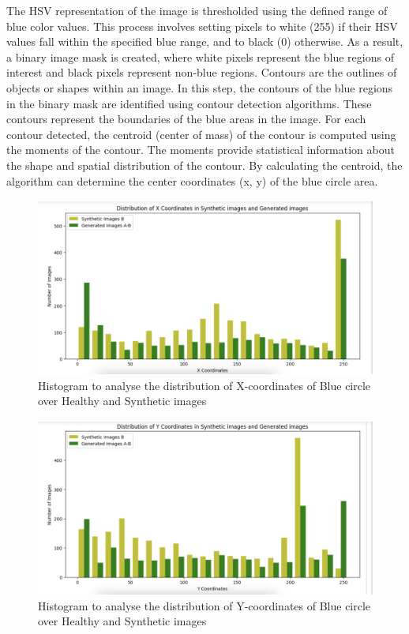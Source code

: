 \documentclass[UKenglish,12pt]{master-style}
\begin{document}
The HSV representation of the image is thresholded using the defined range of blue color values. This process involves setting pixels to white (255) if their HSV values fall within the specified blue range, and to black (0) otherwise. As a result, a binary image mask is created, where white pixels represent the blue regions of interest and black pixels represent non-blue regions. Contours are the outlines of objects or shapes within an image. In this step, the contours of the blue regions in the binary mask are identified using contour detection algorithms. These contours represent the boundaries of the blue areas in the image. For each contour detected, the centroid (center of mass) of the contour is computed using the moments of the contour. The moments provide statistical information about the shape and spatial distribution of the contour. By calculating the centroid, the algorithm can determine the center coordinates (x, y) of the blue circle area.

\begin{figure}[htbp]
    \centering
    \includegraphics[width=1\textwidth]{Images/x_coordinates.png}
    \caption{Histogram to analyse the distribution of X-coordinates of Blue circle over Healthy and Synthetic images}
    \label{fig:x_coordinates}
\end{figure}

\begin{figure}[htbp]
    \centering
    \includegraphics[width=1\textwidth]{Images/y_coordinates.png}
    \caption{Histogram to analyse the distribution of Y-coordinates of Blue circle over Healthy and Synthetic images}
    \label{fig:y_coordinates}
\end{figure}
\end{document}
